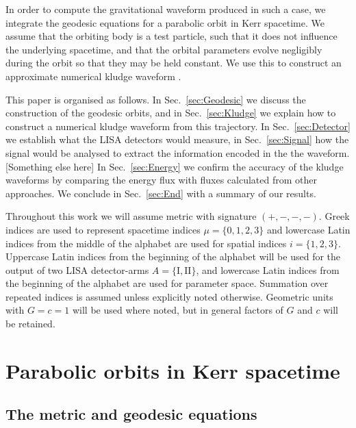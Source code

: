 \documentclass[useAMS,usedcolumn,usegraphicx,usenatbib]{mn2e}
\newcommand{\secref}[1]{Sec.~\ref{sec:#1}}
\begin{document}
In order to compute the gravitational waveform produced in such a case, we integrate the geodesic equations for a parabolic orbit in Kerr spacetime. We assume that the orbiting body is a test particle, such that it does not influence the underlying spacetime, and that the orbital parameters evolve negligibly during the orbit so that they may be held constant. We use this to construct an approximate numerical kludge waveform \citep{Babak2007}.

This paper is organised as follows. In \secref{Geodesic} we discuss the construction of the geodesic orbits, and in \secref{Kludge} we explain how to construct a numerical kludge waveform from this trajectory. In \secref{Detector} we establish what the LISA detectors would measure, in \secref{Signal} how the signal would be analysed to extract the information encoded in the the waveform. [Something else here] In \secref{Energy} we confirm the accuracy of the kludge waveforms by comparing the energy flux with fluxes calculated from other approaches. We conclude in \secref{End} with a summary of our results.

Throughout this work we will assume metric with signature $(+,-,-,-)$. Greek indices are used to represent spacetime indices $\mu = \{0,1,2,3\}$ and lowercase Latin indices from the middle of the alphabet are used for spatial indices $i = \{1,2,3\}$. Uppercase Latin indices from the beginning of the alphabet will be used for the output of two LISA detector-arms $A = \{\mathrm{I}, \mathrm{II}\}$, and lowercase Latin indices from the beginning of the alphabet are used for parameter space. Summation over repeated indices is assumed unless explicitly noted otherwise. Geometric units with $G = c = 1$ will be used where noted, but in general factors of $G$ and $c$ will be retained.

\section{Parabolic orbits in Kerr spacetime\label{sec:Geodesic}}

\subsection{The metric and geodesic equations}
\end{document}

